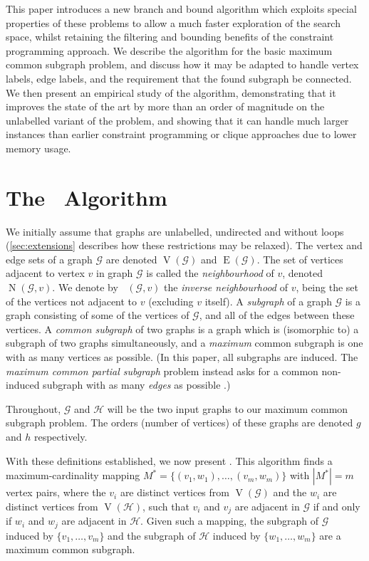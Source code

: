 \documentclass[letterpaper]{article}
\newcommand{\citep}[1]{\cite{#1}}
\newcommand{\McSplit}{\textproc{McSplit}}
\newcommand{\graphG}{\mathcal{G}}
\newcommand{\graphH}{\mathcal{H}}
\DeclareMathOperator{\V}{V}
\DeclareMathOperator{\E}{E}
\DeclareMathOperator{\N}{N}
\DeclareMathOperator{\invN}{\overline{N}}
\begin{document}
This paper introduces a new branch and bound algorithm which exploits special
properties of these problems to allow a much faster exploration of the search
space, whilst retaining the filtering and bounding benefits of the constraint
programming approach. We describe the algorithm for the basic maximum common
subgraph problem, and discuss how it may be adapted to handle vertex labels,
edge labels, and the requirement that the found subgraph be connected. We then
present an empirical study of the algorithm, demonstrating that it improves the
state of the art by more than an order of magnitude on the unlabelled variant
of the problem, and showing that it can handle much larger instances than
earlier constraint programming or clique approaches due to lower memory usage.

\section{The \McSplit\ Algorithm}

We initially assume that graphs are unlabelled, undirected and without loops
(\cref{sec:extensions} describes how these restrictions may be relaxed).
The vertex and edge sets of a graph $\graphG$ are denoted $\V(\graphG)$ and $\E(\graphG)$.  The
set of vertices adjacent to vertex $v$ in graph $\graphG$ is called the
\emph{neighbourhood} of $v$, denoted $\N(\graphG, v)$. We denote by $\invN(\graphG, v)$ the
\emph{inverse neighbourhood} of $v$, being the set of the vertices not adjacent
to $v$ (excluding $v$ itself). A \emph{subgraph} of a graph $\graphG$ is a graph
consisting of some of the vertices of $\graphG$, and all of the edges between these
vertices. A \emph{common subgraph} of two graphs is a graph which is
(isomorphic to) a subgraph of two graphs simultaneously, and a \emph{maximum}
common subgraph is one with as many vertices as possible. (In this paper, all
subgraphs are induced. The \emph{maximum common partial subgraph} problem
instead asks for a common non-induced subgraph with as many \emph{edges} as
possible \citep{DBLP:conf/cp/NdiayeS11}.)

Throughout, $\graphG$ and $\graphH$ will be the two input graphs to our maximum
common subgraph problem.  The orders (number of vertices) of these graphs are
denoted $g$ and $h$ respectively.

With these definitions established, we now present \McSplit. This algorithm
finds a maximum-cardinality mapping $M^* = \{(v_1, w_1), \dots, (v_{m},
w_{m})\}$ with $|M^*| = m$ vertex pairs, where the $v_i$ are distinct vertices
from $\V(\graphG)$ and the $w_i$ are distinct vertices from $\V(\graphH)$, such
that $v_i$ and $v_j$ are adjacent in $\graphG$ if and only if $w_i$ and $w_j$
are adjacent in $\graphH$.  Given such a mapping, the subgraph of $\graphG$
induced by $\{v_1, \dots, v_{m}\}$ and the subgraph of $\graphH$ induced by
$\{w_1, \dots, w_{m}\}$ are a maximum common subgraph.
\end{document}

